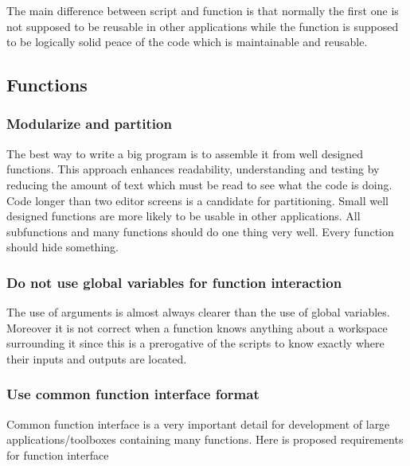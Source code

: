\documentclass[titlepage,a4paper,12pt]{article}
\begin{document}
The main difference between script and function is that normally the first
one is not supposed to be reusable in other applications while the function is supposed to
be logically solid peace of the code which is maintainable and reusable.

\subsection{Functions}
\subsubsection{Modularize and partition}
The best way to write a big program is to assemble it from well
designed functions. This approach enhances readability,
understanding and testing by reducing the amount of text which must
be read to see what the code is doing. Code longer than two editor
screens is a candidate for partitioning. Small well designed
functions are more likely to be usable in other applications. All
subfunctions and many functions should do one thing very well. Every
function should hide something.
\subsubsection{Do not use global variables for function interaction}
The use of arguments is almost always clearer than the use of global
variables. Moreover it is not correct when a function knows anything
about a workspace surrounding it since this is a prerogative of the
scripts to know exactly where their inputs and outputs are located.

\subsubsection{Use common function interface format}
\label{funcInterface}
 Common function interface is a very important
detail for development of large applications/toolboxes containing
many functions. Here is proposed requirements for function interface
\end{document}
